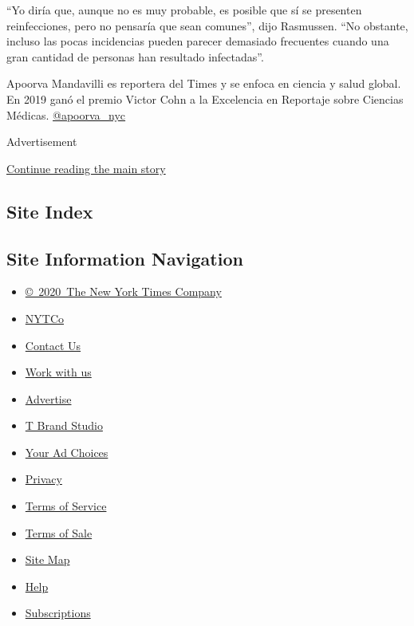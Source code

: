 ``Yo diría que, aunque no es muy probable, es posible que sí se
presenten reinfecciones, pero no pensaría que sean comunes'', dijo
Rasmussen. ``No obstante, incluso las pocas incidencias pueden parecer
demasiado frecuentes cuando una gran cantidad de personas han resultado
infectadas''.

Apoorva Mandavilli es reportera del Times y se enfoca en ciencia y salud
global. En 2019 ganó el premio Victor Cohn a la Excelencia en Reportaje
sobre Ciencias Médicas.
\href{https://twitter.com/apoorva_nyc}{@apoorva\_nyc}

Advertisement

\protect\hyperlink{after-bottom}{Continue reading the main story}

\hypertarget{site-index}{%
\subsection{Site Index}\label{site-index}}

\hypertarget{site-information-navigation}{%
\subsection{Site Information
Navigation}\label{site-information-navigation}}

\begin{itemize}
\tightlist
\item
  \href{https://help.nytimes3xbfgragh.onion/hc/en-us/articles/115014792127-Copyright-notice}{©~2020~The
  New York Times Company}
\end{itemize}

\begin{itemize}
\tightlist
\item
  \href{https://www.nytco.com/}{NYTCo}
\item
  \href{https://help.nytimes3xbfgragh.onion/hc/en-us/articles/115015385887-Contact-Us}{Contact
  Us}
\item
  \href{https://www.nytco.com/careers/}{Work with us}
\item
  \href{https://nytmediakit.com/}{Advertise}
\item
  \href{http://www.tbrandstudio.com/}{T Brand Studio}
\item
  \href{https://www.nytimes3xbfgragh.onion/privacy/cookie-policy\#how-do-i-manage-trackers}{Your
  Ad Choices}
\item
  \href{https://www.nytimes3xbfgragh.onion/privacy}{Privacy}
\item
  \href{https://help.nytimes3xbfgragh.onion/hc/en-us/articles/115014893428-Terms-of-service}{Terms
  of Service}
\item
  \href{https://help.nytimes3xbfgragh.onion/hc/en-us/articles/115014893968-Terms-of-sale}{Terms
  of Sale}
\item
  \href{https://spiderbites.nytimes3xbfgragh.onion}{Site Map}
\item
  \href{https://help.nytimes3xbfgragh.onion/hc/en-us}{Help}
\item
  \href{https://www.nytimes3xbfgragh.onion/subscription?campaignId=37WXW}{Subscriptions}
\end{itemize}
